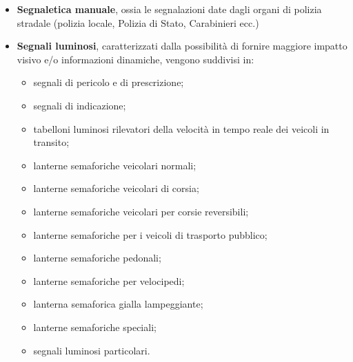 \begin{itemize}
	
	\item \textbf{Segnaletica manuale}, ossia le segnalazioni date dagli organi di polizia stradale (polizia locale, Polizia di Stato, Carabinieri ecc.)
	      
	\item \textbf{Segnali luminosi}, caratterizzati dalla possibilità di fornire maggiore impatto visivo e/o informazioni dinamiche, vengono suddivisi in:
	      \begin{itemize}
	      	\item segnali di pericolo e di prescrizione;
	      	\item segnali di indicazione;
	      	\item tabelloni luminosi rilevatori della velocità in tempo reale dei veicoli in transito;
	      	\item lanterne semaforiche veicolari normali;
	      	\item lanterne semaforiche veicolari di corsia;
	      	\item lanterne semaforiche veicolari per corsie reversibili;
	      	\item lanterne semaforiche per i veicoli di trasporto pubblico;
	      	\item lanterne semaforiche pedonali;
	      	\item lanterne semaforiche per velocipedi;
	      	\item lanterna semaforica gialla lampeggiante;
	      	\item lanterne semaforiche speciali;
	      	\item segnali luminosi particolari.
	      	      

\end{itemize}
\end{itemize}
